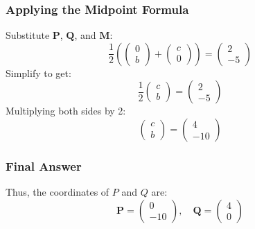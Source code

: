 \documentclass{beamer}
\theoremstyle{remark}
\begin{document}
\begin{frame}
\frametitle{Applying the Midpoint Formula}
Substitute $ \mathbf{P} $, $ \mathbf{Q} $, and $ \mathbf{M} $:
\begin{equation*}
\frac{1}{2} \left(\begin{pmatrix} 0 \\ b \end{pmatrix} + \begin{pmatrix} c \\ 0 \end{pmatrix}\right) = \begin{pmatrix} 2 \\ -5 \end{pmatrix}
\end{equation*}
Simplify to get:
\begin{equation*}
\frac{1}{2} \begin{pmatrix} c \\ b \end{pmatrix} = \begin{pmatrix} 2 \\ -5 \end{pmatrix}
\end{equation*}
Multiplying both sides by 2:
\begin{equation*}
\begin{pmatrix} c \\ b \end{pmatrix} = \begin{pmatrix} 4 \\ -10 \end{pmatrix}
\end{equation*}
\end{frame}

\begin{frame}
\frametitle{Final Answer}
Thus, the coordinates of $ P $ and $ Q $ are:
\begin{equation*}
\mathbf{P} = \begin{pmatrix} 0 \\ -10 \end{pmatrix}, \quad \mathbf{Q} = \begin{pmatrix} 4 \\ 0 \end{pmatrix}
\end{equation*}
\end{frame}
\end{document}
